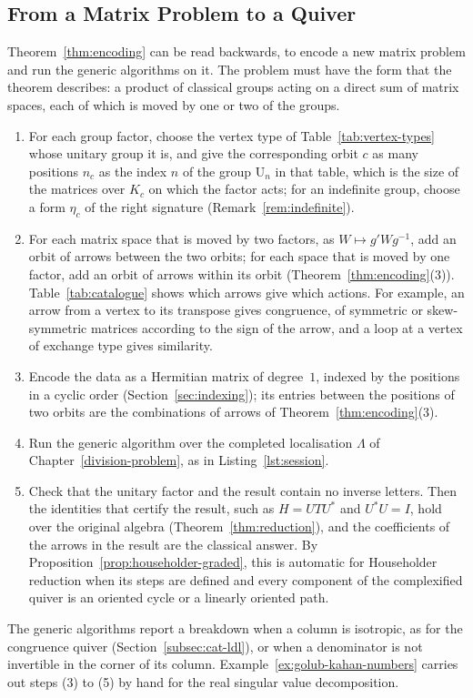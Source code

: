 \documentclass[12pt, a4paper]{report}
\theoremstyle{plain}
\theoremstyle{definition}
\theoremstyle{remark}
\theoremstyle{plain}
\newcommand{\Un}{\mathrm{U}}
\begin{document}
\subsection{From a Matrix Problem to a Quiver}
\label{subsec:recipe}
Theorem~\ref{thm:encoding} can be read backwards, to encode a new matrix problem and run the generic algorithms on it. The problem must have the form that the theorem describes: a product of classical groups acting on a direct sum of matrix spaces, each of which is moved by one or two of the groups.
\begin{enumerate}
  \item For each group factor, choose the vertex type of Table~\ref{tab:vertex-types} whose unitary group it is, and give the corresponding orbit $c$ as many positions $n_c$ as the index $n$ of the group $\Un_n$ in that table, which is the size of the matrices over $K_c$ on which the factor acts; for an indefinite group, choose a form $\eta_c$ of the right signature (Remark~\ref{rem:indefinite}).
  \item For each matrix space that is moved by two factors, as $W\mapsto g'Wg^{-1}$, add an orbit of arrows between the two orbits; for each space that is moved by one factor, add an orbit of arrows within its orbit (Theorem~\ref{thm:encoding}(3)). Table~\ref{tab:catalogue} shows which arrows give which actions. For example, an arrow from a vertex to its transpose gives congruence, of symmetric or skew-symmetric matrices according to the sign of the arrow, and a loop at a vertex of exchange type gives similarity.
  \item Encode the data as a Hermitian matrix of degree~$1$, indexed by the positions in a cyclic order (Section~\ref{sec:indexing}); its entries between the positions of two orbits are the combinations of arrows of Theorem~\ref{thm:encoding}(3).
  \item Run the generic algorithm over the completed localisation $\Lambda$ of Chapter~\ref{division-problem}, as in Listing~\ref{lst:session}.
  \item Check that the unitary factor and the result contain no inverse letters. Then the identities that certify the result, such as $H=UTU^*$ and $U^*U=I$, hold over the original algebra (Theorem~\ref{thm:reduction}), and the coefficients of the arrows in the result are the classical answer. By Proposition~\ref{prop:householder-graded}, this is automatic for Householder reduction when its steps are defined and every component of the complexified quiver is an oriented cycle or a linearly oriented path.
\end{enumerate}
The generic algorithms report a breakdown when a column is isotropic, as for the congruence quiver (Section~\ref{subsec:cat-ldl}), or when a denominator is not invertible in the corner of its column. Example~\ref{ex:golub-kahan-numbers} carries out steps (3) to (5) by hand for the real singular value decomposition.
\end{document}

